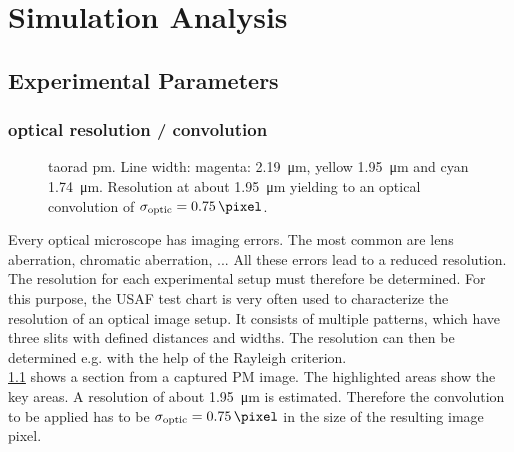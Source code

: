 \setcounter{chapter}{7}
\chapter{Simulation Analysis}
\label{cha:simulation_analysis}
% 
% 
% 
\section{Experimental Parameters}
% 
% 
% 
\subsection{optical resolution / convolution \texorpdfstring{\opticsigma}{sigma\_optic}}
% 
\begin{figure}[!t]
\centering
{}
\caption[USAF test chart measurement]{taorad pm. Line width: magenta: \SI{2.19}{\micro\meter}, yellow \SI{1.95}{\micro\meter} and cyan \SI{1.74}{\micro\meter}. Resolution at about \SI{1.95}{\micro\meter} yielding to an optical convolution of $\opticsigma = \SI{0.75}{\pixel}$. }
\label{fig:USAF}
\end{figure}
% 
Every optical microscope has imaging errors. The most common are lens aberration, chromatic aberration, ...
All these errors lead to a reduced resolution. The resolution for each experimental setup must therefore be determined. For this purpose, the USAF test chart is very often used to characterize the resolution of an optical image setup. It consists of multiple patterns, which have three slits with defined distances and widths. The resolution can then be determined e.g. with the help of the Rayleigh criterion.
% 
\\
% 
\cref{fig:USAF} shows a section from a captured PM image. The highlighted areas show the key areas. A resolution of about \SI{1.95}{\micro\meter} is estimated. Therefore the convolution to be applied has to be $\opticsigma = \SI{0.75}{\pixel}$ in the size of the resulting image pixel.
% 
% 
% 
